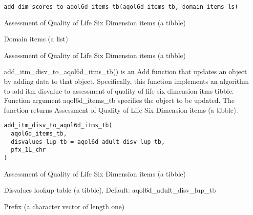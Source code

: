 \documentclass[a4paper]{book}
\begin{document}
%
\begin{Usage}
\begin{verbatim}
add_dim_scores_to_aqol6d_items_tb(aqol6d_items_tb, domain_items_ls)
\end{verbatim}
\end{Usage}
%
\begin{Arguments}
\begin{ldescription}
\item[\code{aqol6d\_items\_tb}] Assessment of Quality of Life Six Dimension items (a tibble)

\item[\code{domain\_items\_ls}] Domain items (a list)
\end{ldescription}
\end{Arguments}
%
\begin{Value}
Assessment of Quality of Life Six Dimension items (a tibble)
\end{Value}
%
\begin{Description}\relax
add\_itm\_disv\_to\_aqol6d\_itms\_tb() is an Add function that updates an object by adding data to that object. Specifically, this function implements an algorithm to add itm disvalue to assessment of quality of life six dimension itms tibble. Function argument aqol6d\_items\_tb specifies the object to be updated. The function returns Assessment of Quality of Life Six Dimension items (a tibble).
\end{Description}
%
\begin{Usage}
\begin{verbatim}
add_itm_disv_to_aqol6d_itms_tb(
  aqol6d_items_tb,
  disvalues_lup_tb = aqol6d_adult_disv_lup_tb,
  pfx_1L_chr
)
\end{verbatim}
\end{Usage}
%
\begin{Arguments}
\begin{ldescription}
\item[\code{aqol6d\_items\_tb}] Assessment of Quality of Life Six Dimension items (a tibble)

\item[\code{disvalues\_lup\_tb}] Disvalues lookup table (a tibble), Default: aqol6d\_adult\_disv\_lup\_tb

\item[\code{pfx\_1L\_chr}] Prefix (a character vector of length one)
\end{ldescription}
\end{Arguments}
\end{document}
